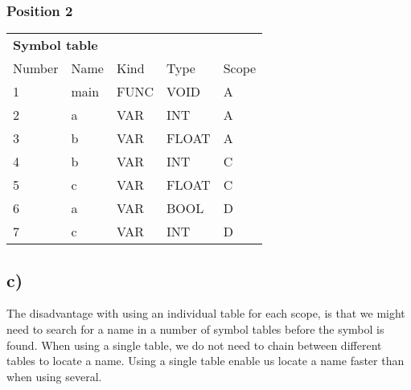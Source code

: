 \subsubsection*{Position 2}
\begin{tabular}{|l l l l l|}
	\hline
	\multicolumn{5}{|l|}{\textbf{Symbol table}} \\
	Number & Name & Kind & Type & Scope	\\
	\hline
	1 & main & FUNC & VOID & A \\
	2 & a & VAR & INT & A \\
	3 & b & VAR & FLOAT & A \\
	4 & b & VAR & INT & C \\
	5 & c & VAR & FLOAT & C \\
	6 & a & VAR & BOOL & D \\
	7 & c & VAR & INT & D \\
	\hline
\end{tabular}
\subsection*{c)}
The disadvantage with using an individual table for each scope, is that we might need to search for a name in a number of symbol tables before the symbol is found. When using a single table, we do not need to chain between different tables to locate a name. Using a single table enable us locate a name faster than when using several. 

